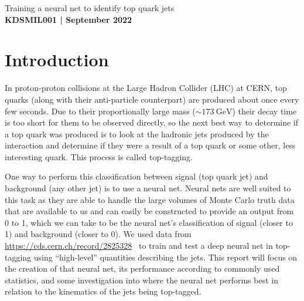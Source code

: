 \documentclass[11pt]{article}
\numberwithin{equation}{section}
\numberwithin{figure}{section}
\numberwithin{table}{section}
\begin{document}
\begin{center}
    {\huge Training a neural net to identify top quark jets}\\
    \vspace{0.2in}
    \textbf{KDSMIL001 | September 2022}    
    
    \begin{abstract}
        We train a neural net to identify jets as originating from top quarks as opposed to other quarks; a process known as top tagging. High-level variables describing the jets are used as opposed to constituent data as constituent requires considerably more computing power. The model's accuracy is then determined for different cuts of jet kinematics to investigate where the model has deficiencies.
    \end{abstract}
\end{center}

\section{Introduction}\label{sec:Introduction}
In proton-proton collisions at the Large Hadron Collider (LHC) at CERN, top quarks (along with their anti-particle counterpart) are produced about once every few seconds. Due to their proportionally large mass ($\sim\SI{173}{\giga\electronvolt}$) their decay time is too short for them to be observed directly, so the next best way to determine if a top quark was produced is to look at the hadronic jets produced by the interaction and determine if they were a result of a top quark or some other, less interesting quark. This process is called top-tagging.

One way to perform this classification between signal (top quark jet) and background (any other jet) is to use a neural net. Neural nets are well suited to this task as they are able to handle the large volumes of Monte Carlo truth data that are available to us and can easily be constructed to provide an output from 0 to 1, which we can take to be the neural net's classification of signal (closer to 1) and background (closer to 0). We used data from \url{https://cds.cern.ch/record/2825328}~\cite{top-tagging-data} to train and test a deep neural net in top-tagging using ``high-level'' quantities describing the jets. This report will focus on the creation of that neural net, its performance according to commonly used statistics, and some investigation into where the neural net performs best in relation to the kinematics of the jets being top-tagged.
\end{document}
